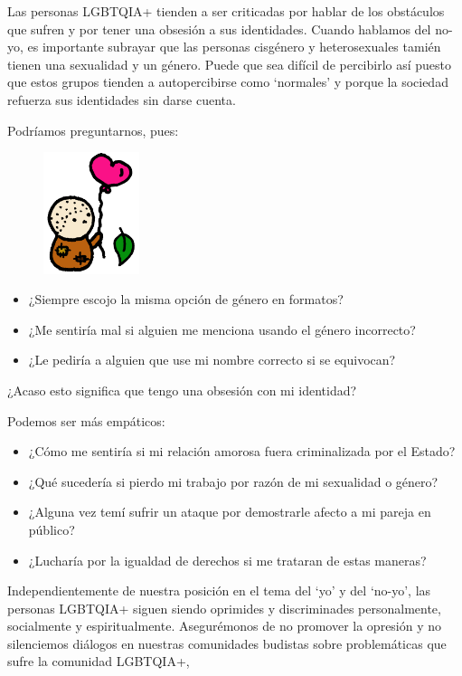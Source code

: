 \documentclass[12pt,openany]{book}
\begin{document}
Las personas LGBTQIA+ tienden a ser criticadas por hablar de los obstáculos que sufren y por tener una obsesión a sus identidades. Cuando hablamos del no-yo, es importante subrayar que las personas cisgénero y heterosexuales tamién tienen una sexualidad y un género. Puede que sea difícil de percibirlo así puesto que estos grupos tienden a autopercibirse como `normales' y porque la sociedad refuerza sus identidades sin darse cuenta.

Podríamos preguntarnos, pues:
\begin{figure}
    \centering
    \includegraphics[width=0.25\textwidth]{33c.png}
\end{figure}
\begin{itemize}
\setlength\itemsep{-0.3em}
\item ¿Siempre escojo la misma opción de género en formatos?
\item ¿Me sentiría mal si alguien me menciona usando el género incorrecto?
\item ¿Le pediría a alguien que use mi nombre correcto si se equivocan?
\end{itemize}

¿Acaso esto significa que tengo una obsesión con mi identidad?

Podemos ser más empáticos:

\begin{itemize}
\setlength\itemsep{-0.3em}
\item ¿Cómo me sentiría si mi relación amorosa fuera criminalizada por el Estado?
\item ¿Qué sucedería si pierdo mi trabajo por razón de mi sexualidad o género?
\item ¿Alguna vez temí sufrir un ataque por demostrarle afecto a mi pareja en público?
\item ¿Lucharía por la igualdad de derechos si me trataran de estas maneras?
\end{itemize}

Independientemente de nuestra posición en el tema del `yo' y del `no-yo', las personas LGBTQIA+ siguen siendo oprimides y discriminades personalmente, socialmente y espiritualmente. Asegurémonos de no promover la opresión y no silenciemos diálogos en nuestras comunidades budistas sobre problemáticas que sufre la comunidad LGBTQIA+,
\end{document}
